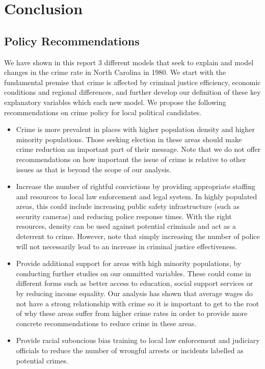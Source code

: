 \documentclass[]{article}
\begin{document}
\hypertarget{conclusion}{%
\section{Conclusion}\label{conclusion}}

\hypertarget{policy-recommendations}{%
\subsection{Policy Recommendations}\label{policy-recommendations}}

We have shown in this report 3 different models that seek to explain and
model changes in the crime rate in North Carolina in 1980. We start with
the fundamental premise that crime is affected by criminal justice
efficiency, economic conditions and regional differences, and further
develop our definition of these key explanatory variables which each new
model. We propose the following recommendations on crime policy for
local political candidates.

\begin{itemize}
  \item Crime is more prevalent in places with higher population density and higher minority populations. Those seeking election in these areas should make crime reduction an important part of their message. Note that we do not offer recommendations on how important the issue of crime is relative to other issues as that is beyond the scope of our analysis.
  \item Increase the number of rightful convictions by providing appropriate staffing and resources to local law enforcement and legal system. In highly populated areas, this could include increasing public safety infrastructure (such as security cameras) and reducing police response times. With the right resources, density can be used against potential criminals and act as a deterrent to crime. However, note that simply increasing the number of police will not necessarily lead to an increase in criminal justice effectiveness.
  \item Provide additional support for areas with high minority populations, by conducting further studies on our ommitted variables. These could come in different forms such as better access to education, social support services or by reducing income equality. Our analysis has shown that average wages do not have a strong relationship with crime so it is important to get to the root of why these areas suffer from higher crime rates in order to provide more concrete recommendations to reduce crime in these areas.
    \item Provide racial suboncious bias training to local law enforcement and judiciary officials to reduce the number of wrongful arrests or incidents labelled as potential crimes.
\end{itemize}
\end{document}
